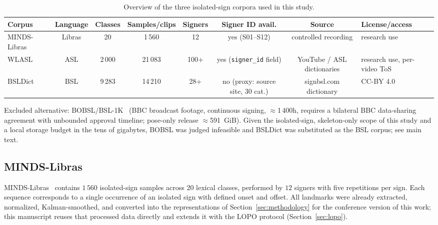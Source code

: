 \documentclass[journal]{IEEEtran}
\begin{document}
\begin{table}[t]
\centering
\caption{Overview of the three isolated-sign corpora used in this study.}
\label{tab:datasets}
\begin{threeparttable}
\begin{tabular}{lccccccl}
\toprule
Corpus & Language & Classes & Samples/clips & Signers & Signer ID avail. & Source & License/access \\
\midrule
MINDS-Libras~\cite{rezende2021minds} & Libras & 20 & 1\,560 & 12 & yes (S01--S12) & controlled recording & research use \\
WLASL~\cite{wlasl2020} & ASL & 2\,000 & 21\,083 & 100+ & yes (\texttt{signer\_id} field) & YouTube / ASL dictionaries & research use, per-video ToS \\
BSLDict~\cite{momeni2020bsldict} & BSL & 9\,283 & 14\,210 & 28+ & no (proxy: source site, 30 cat.) & signbsl.com dictionary & CC-BY 4.0 \\
\bottomrule
\end{tabular}
\begin{tablenotes}
\footnotesize
\item Excluded alternative: BOBSL/BSL-1K~\cite{albanie2020bsl1k,albanie2021bobsl} (BBC broadcast footage, continuous signing, $\approx$1\,400h, requires a bilateral BBC data-sharing agreement with unbounded approval timeline; pose-only release $\approx$591~GiB). Given the isolated-sign, skeleton-only scope of this study and a local storage budget in the tens of gigabytes, BOBSL was judged infeasible and BSLDict was substituted as the BSL corpus; see main text.
\end{tablenotes}
\end{threeparttable}
\end{table}

\subsection{MINDS-Libras}
MINDS-Libras~\cite{rezende2021minds} contains $1\,560$ isolated-sign samples across $20$ lexical classes, performed by $12$ signers with five repetitions per sign. Each sequence corresponds to a single occurrence of an isolated sign with defined onset and offset. All landmarks were already extracted, normalized, Kalman-smoothed, and converted into the representations of Section~\ref{sec:methodology} for the conference version of this work; this manuscript reuses that processed data directly and extends it with the LOPO protocol (Section~\ref{sec:lopo}).
\end{document}
